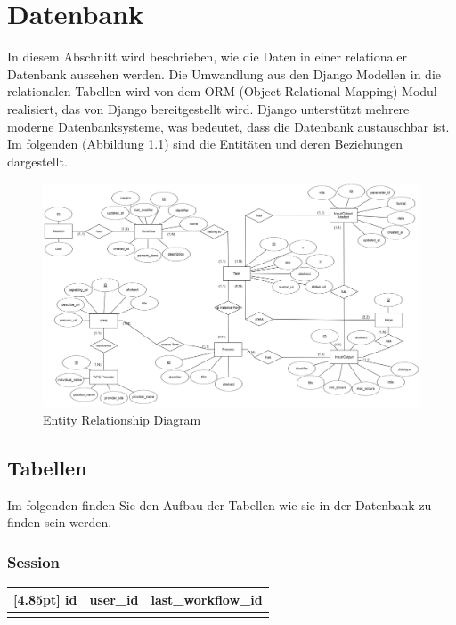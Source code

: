 \chapter{Datenbank}

   In diesem Abschnitt wird beschrieben, wie die Daten in einer relationaler Datenbank aussehen werden. Die Umwandlung aus den Django Modellen in die relationalen Tabellen wird von dem ORM (Object Relational Mapping) Modul realisiert, das von Django bereitgestellt wird. Django unterstützt mehrere moderne Datenbanksysteme, was bedeutet, dass die Datenbank austauschbar ist. Im folgenden (Abbildung \ref{fig:er_diagramm}) sind die Entitäten und deren Beziehungen dargestellt. 

    \begin{figure}[h]
        \centering
        \includegraphics[width=15cm]{diagrams/ERDiagramm.png}
        \caption{Entity Relationship Diagram}
        \label{fig:er_diagramm}
    \end{figure}
	
	
	\section{Tabellen}
	
	    Im folgenden finden Sie den Aufbau der Tabellen wie sie in der Datenbank zu finden sein werden.\newline
	
 		\subsection{Session}
 		\begin{center}
 			\setlength\tabcolsep{5pt}
 			\renewcommand{\arraystretch}{1.5}
 			\setcounter{ids}{0}			
 			\begin{tabular}{|c|c|c|}
 				\hline
 				\rowcolor[gray]{0.75}[4.85pt]
 				id & user\_id & last\_workflow\_id \\ \hline  
 				&& \\	
 				\hline
 			\end{tabular}
 		\end{center}		


